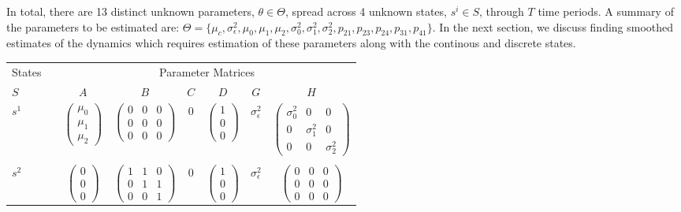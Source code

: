 \documentclass[12pt]{article}
\begin{document}
In total, there are 13 distinct unknown parameters,
\(\theta \in \Theta\), spread across 4 unknown states, \(s^i \in S\),
through \(T\) time periods. A summary of the parameters to be estimated
are:
\(\Theta = \{\mu_c, \sigma^2_\epsilon, \mu_0, \mu_1, \mu_2, \sigma^2_0, \sigma^2_1, \sigma^2_2, p_{21}, p_{23}, p_{24}, p_{31}, p_{41}\}\).
In the next section, we discuss finding smoothed estimates of the
dynamics which requires estimation of these parameters along with the
continous and discrete states.

\begin{table}
\centering
\begin{tabular}[h!]{@{}llccccccc@{}}
\toprule
  \multicolumn{2}{c}{States} &\phantom{a}& \multicolumn{6}{c}{Parameter Matrices}\\
  \cmidrule{1-2} \cmidrule{4-9}
  $S$ &&& $A$ & $B$ & $C$ & $D$ & $G$ & $H$ \\
  \midrule
  $s^1$ & && $\begin{pmatrix} \mu_0 \\ \mu_1 \\ \mu_2 \end{pmatrix}$ & $\begin{pmatrix} 0&0&0 \\ 0&0&0 \\ 0&0&0 \end{pmatrix}$ & 0 & $\begin{pmatrix} 1\\ 0 \\ 0 \end{pmatrix}$ & $\sigma_\epsilon^2$ & $\begin{pmatrix} \sigma_0^2&0&0 \\ 0&\sigma_1^2&0 \\ 0&0&\sigma_2^2 \end{pmatrix}$\\
  \\
  $s^2$ & && $\begin{pmatrix} 0 \\ 0 \\ 0 \end{pmatrix}$ & $\begin{pmatrix} 1&1&0 \\ 0&1&1 \\ 0&0&1 \end{pmatrix}$ & 0 & $\begin{pmatrix} 1\\ 0 \\ 0 \end{pmatrix}$ & $\sigma_\epsilon^2$ & $\begin{pmatrix} 0&0&0 \\ 0&0&0 \\ 0&0&0 \end{pmatrix}$\\

\end{tabular}
\end{table}
\end{document}

